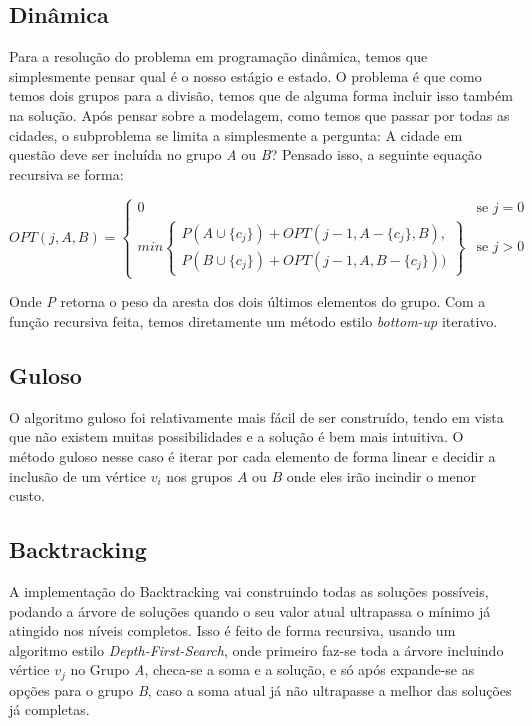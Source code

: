 \documentclass[a4paper,11pt,oneside]{article}
\begin{document}
    \subsection{Din\^amica}
    Para a resolu\c{c}\~{a}o do problema em programa\c{c}\~{a}o din\^amica, temos que simplesmente pensar qual \'e o nosso est\'agio e estado.
    O problema \'e que como temos dois grupos para a divis\~{a}o, temos que de alguma forma incluir isso tamb\'em na solu\c{c}\~{a}o. Ap\'os pensar sobre a modelagem, como temos que passar por todas as cidades, o subproblema se limita a simplesmente a pergunta: A cidade em quest\~{a}o deve ser inclu\'ida no grupo \textit{A} ou \textit{B}? Pensado isso, a seguinte equa\c{c}\~{a}o recursiva se forma:
    
    \[
      OPT(j, A, B) = 
      \begin{cases}
      0 & \text{se } j = 0  \\
      min\left\{ \begin{aligned}
	P(A \cup \{c_j\}) + OPT(j-1, A - \{c_j\}, B), \\
	P(B \cup \{c_j\}) + OPT(j-1, A, B - \{c_j\}))
		  \end{aligned}
	\right\} & \text{se } j > 0
      \end{cases}
    \]
    
    Onde \textit{P} retorna o peso da aresta dos dois \'ultimos elementos do grupo. Com a fun\c{c}\~{a}o recursiva feita, temos diretamente um m\'etodo estilo \textit{bottom-up} iterativo.
    
    \subsection{Guloso}
    O algoritmo guloso foi relativamente mais f\'acil de ser constru\'ido, tendo em vista que n\~{a}o existem muitas possibilidades e a solu\c{c}\~{a}o \'e bem mais intuitiva. O m\'etodo guloso nesse caso \'e iterar por cada elemento de forma linear e decidir a inclus\~{a}o de um v\'ertice \begin{math} v_i \end{math} nos grupos \begin{math} A \text{ ou } B \end{math} onde eles ir\~{a}o incindir o menor custo.
    
    \subsection{Backtracking}
    A implementa\c{c}\~{a}o do Backtracking vai construindo todas as solu\c{c}\~{o}es poss\'iveis, podando a \'arvore de solu\c{c}\~{o}es quando o seu valor atual ultrapassa o m\'inimo j\'a atingido nos n\'iveis completos. Isso \'e feito de forma recursiva, usando um algoritmo estilo \textit{Depth-First-Search}, onde primeiro faz-se toda a \'arvore incluindo v\'ertice \begin{math} v_j \end{math} no Grupo \textit{A}, checa-se a soma e a solu\c{c}\~{a}o, e s\'o ap\'os expande-se as op\c{c}\~{o}es para o grupo \textit{B}, caso a soma atual j\'a n\~{a}o ultrapasse a melhor das solu\c{c}\~{o}es j\'a completas.
\end{document}
